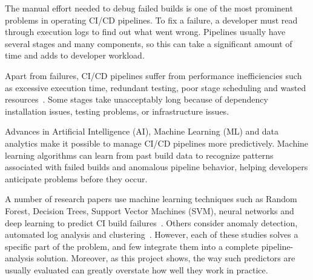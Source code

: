 The manual effort needed to debug failed builds is one of the most prominent problems in operating CI/CD pipelines. To fix a failure, a developer must read through execution logs to find out what went wrong. Pipelines usually have several stages and many components, so this can take a significant amount of time and adds to developer workload.

Apart from failures, CI/CD pipelines suffer from performance inefficiencies such as excessive execution time, redundant testing, poor stage scheduling and wasted resources~\cite{ghaleb2019empirical}. Some stages take unacceptably long because of dependency installation issues, testing problems, or infrastructure issues.

Advances in Artificial Intelligence (AI), Machine Learning (ML) and data analytics make it possible to manage CI/CD pipelines more predictively. Machine learning algorithms can learn from past build data to recognize patterns associated with failed builds and anomalous pipeline behavior, helping developers anticipate problems before they occur.

A number of research papers use machine learning techniques such as Random Forest, Decision Trees, Support Vector Machines (SVM), neural networks and deep learning to predict CI build failures~\cite{saidani2020predicting,saidani2022improving,kumar2025optimizing}. Others consider anomaly detection, automated log analysis and clustering~\cite{zhang2022buildsheriff}. However, each of these studies solves a specific part of the problem, and few integrate them into a complete pipeline-analysis solution. Moreover, as this project shows, the way such predictors are usually evaluated can greatly overstate how well they work in practice.

